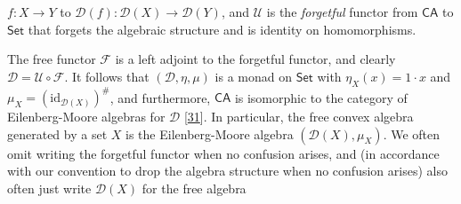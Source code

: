\documentclass[11pt,a4paper]{amsart}
\begin{document}
\hypertarget{html:S5.SS0.SSS0.P0.SPx2.p1.m10}{}\({f\colon X\to Y}\) to %
\hypertarget{html:S5.SS0.SSS0.P0.SPx2.p1.m11}{}\({{\mathcal{D}}(f)\colon{\mathcal{D}}(X)\to{\mathcal{D}}(Y)}\), and %
\hypertarget{html:S5.SS0.SSS0.P0.SPx2.p1.m12}{}\({{\mathcal{U}}}\) is the \emph{forgetful} functor from %
\hypertarget{html:S5.SS0.SSS0.P0.SPx2.p1.m13}{}\({\mathsf{CA}}\) to %
\hypertarget{html:S5.SS0.SSS0.P0.SPx2.p1.m14}{}\({\mathsf{Set}}\) that forgets the algebraic structure and is identity on homomorphisms.
\par\medskip
\hypertarget{html:S5.SS0.SSS0.P0.SPx2.p2}{} The free functor %
\hypertarget{html:S5.SS0.SSS0.P0.SPx2.p2.m1}{}\({\mathcal{F}}\) is a left adjoint to the forgetful functor, and clearly %
\hypertarget{html:S5.SS0.SSS0.P0.SPx2.p2.m2}{}\({{\mathcal{D}}={\mathcal{U}}\circ{\mathcal{F}}}\). It follows that %
\hypertarget{html:S5.SS0.SSS0.P0.SPx2.p2.m3}{}\({({\mathcal{D}},\eta,\mu)}\) is a monad on %
\hypertarget{html:S5.SS0.SSS0.P0.SPx2.p2.m4}{}\({\mathsf{Set}}\) with %
\hypertarget{html:S5.SS0.SSS0.P0.SPx2.p2.m5}{}\({\eta_{X}(x)=1\cdot x}\) and %
\hypertarget{html:S5.SS0.SSS0.P0.SPx2.p2.m6}{}\({\mu_{X}=(\mathrm{id}_{{\mathcal{D}}(X)})^{\#}}\), and furthermore, %
\hypertarget{html:S5.SS0.SSS0.P0.SPx2.p2.m7}{}\({\mathsf{CA}}\) is isomorphic to the category of Eilenberg-Moore algebras for %
\hypertarget{html:S5.SS0.SSS0.P0.SPx2.p2.m8}{}\({{\mathcal{D}}}\) [\hyperlink{html:bib.bib31}{31}]. In particular, the free convex algebra generated by a set %
\hypertarget{html:S5.SS0.SSS0.P0.SPx2.p2.m9}{}\({X}\) is the Eilenberg-Moore algebra %
\hypertarget{html:S5.SS0.SSS0.P0.SPx2.p2.m10}{}\({({\mathcal{D}}(X),\mu_{X})}\). We often omit writing the forgetful functor when no confusion arises, and (in accordance with our convention to drop the algebra structure when no confusion arises) also often just write %
\hypertarget{html:S5.SS0.SSS0.P0.SPx2.p2.m11}{}\({{\mathcal{D}}(X)}\) for the free algebra %
\end{document}
